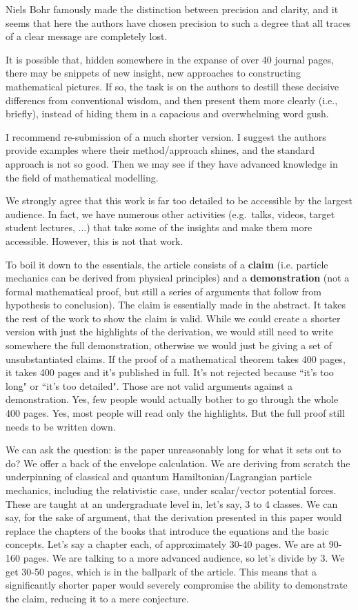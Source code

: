 \documentclass[10pt]{article}
\begin{document}
\begin{response}{
		
		Niels Bohr famously made the distinction between precision and clarity, and it seems that here the authors have chosen precision to such a degree that all traces of a clear message are completely lost. 
		
		It is possible that, hidden somewhere in the expanse of over 40 journal pages, there may be snippets of new insight, new approaches to constructing mathematical pictures. If so, the task is on the authors to destill these decisive differencs from conventional wisdom, and then present them more clearly (i.e., briefly), instead of hiding them in a capacious and overwhelming word gush. 
		
		I recommend re-submission of a much shorter version. I suggest the authors provide examples where their method/approach shines, and the standard approach is not so good. Then we may see if they have advanced knowledge in the field of mathematical modelling. 
	}
We strongly agree that this work is far too detailed to be accessible by the largest audience. In fact, we have numerous other activities (e.g.~talks, videos, target student lectures, ...) that take some of the insights and make them more accessible. However, this is not that work.

To boil it down to the essentials, the article consists of a \textbf{claim} (i.e. particle mechanics can be derived from physical principles) and a \textbf{demonstration} (not a formal mathematical proof, but still a series of arguments that follow from hypothesis to conclusion). The claim is essentially made in the abstract. It takes the rest of the work to show the claim is valid. While we could create a shorter version with just the highlights of the derivation, we would still need to write somewhere the full demonstration, otherwise we would just be giving a set of unsubstantiated claims. If the proof of a mathematical theorem takes 400 pages, it takes 400 pages and it's published in full. It's not rejected because ``it's too long" or ``it's too detailed". Those are not valid arguments against a demonstration. Yes, few people would actually bother to go through the whole 400 pages. Yes, most people will read only the highlights. But the full proof still needs to be written down.

We can ask the question: is the paper unreasonably long for what it sets out to do? We offer a back of the envelope calculation. We are deriving from scratch the underpinning of classical and quantum Hamiltonian/Lagrangian particle mechanics, including the relativistic case, under scalar/vector potential forces. These are taught at an undergraduate level in, let's say, 3 to 4 classes. We can say, for the sake of argument, that the derivation presented in this paper would replace the chapters of the books that introduce the equations and the basic concepts. Let's say a chapter each, of approximately 30-40 pages. We are at 90-160 pages. We are talking to a more advanced audience, so let's divide by 3. We get 30-50 pages, which is in the ballpark of the article. This means that a significantly shorter paper would severely compromise the ability to demonstrate the claim, reducing it to a mere conjecture.


\end{response}
\end{document}
